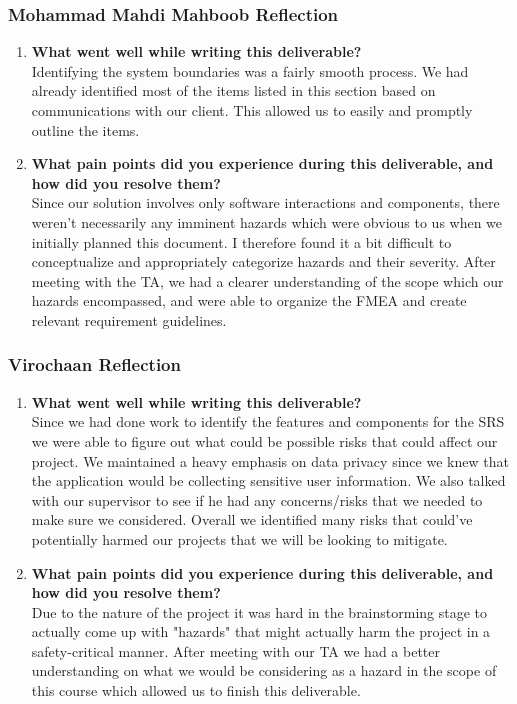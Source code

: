 \documentclass[12pt]{article}
\begin{document}
\subsubsection*{Mohammad Mahdi Mahboob Reflection}
\begin{enumerate}
    \item {\bf What went well while writing this deliverable?}\\
        Identifying the system boundaries was a fairly smooth process. We had already identified most of the items
        listed in this section based on communications with our client. This allowed us to easily and promptly outline
        the items.
    \item {\bf What pain points did you experience during this deliverable, and how did you resolve them?}\\
        Since our solution involves only software interactions and components, there weren't necessarily any imminent
        hazards which were obvious to us when we initially planned this document. I therefore found it a bit difficult
        to conceptualize and appropriately categorize hazards and their severity. After meeting with the TA, we
        had a clearer understanding of the scope which our hazards encompassed, and were able to organize the FMEA and
        create relevant requirement guidelines.
\end{enumerate}
\subsubsection*{Virochaan Reflection}
\begin{enumerate}
    \item \textbf{What went well while writing this deliverable?} \\
    Since we had done work to identify the features and components for the SRS we were able to figure out what could be possible risks that could affect our project. We maintained a heavy emphasis on data privacy since we knew that the application would be collecting sensitive user information. We also talked with our supervisor to see if he had any concerns/risks that we needed to make sure we considered. Overall we identified many risks that could've potentially harmed our projects that we will be looking to mitigate.
    \item \textbf{What pain points did you experience during this deliverable, and how did you resolve them?} \\
    Due to the nature of the project it was hard in the brainstorming stage to actually come up with "hazards" that might actually harm the project in a safety-critical manner. After meeting with our TA we had a better understanding on what we would be considering as a hazard in the scope of this course which allowed us to finish this deliverable.
\end{enumerate}
\end{document}
